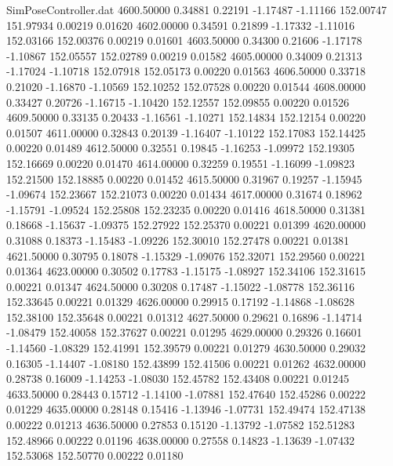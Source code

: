 \begin{filecontents}{SimPoseController.dat}
4600.50000    0.34881    0.22191    -1.17487   -1.11166  152.00747  151.97934    0.00219    0.01620
4602.00000    0.34591    0.21899    -1.17332   -1.11016  152.03166  152.00376    0.00219    0.01601
4603.50000    0.34300    0.21606    -1.17178   -1.10867  152.05557  152.02789    0.00219    0.01582
4605.00000    0.34009    0.21313    -1.17024   -1.10718  152.07918  152.05173    0.00220    0.01563
4606.50000    0.33718    0.21020    -1.16870   -1.10569  152.10252  152.07528    0.00220    0.01544
4608.00000    0.33427    0.20726    -1.16715   -1.10420  152.12557  152.09855    0.00220    0.01526
4609.50000    0.33135    0.20433    -1.16561   -1.10271  152.14834  152.12154    0.00220    0.01507
4611.00000    0.32843    0.20139    -1.16407   -1.10122  152.17083  152.14425    0.00220    0.01489
4612.50000    0.32551    0.19845    -1.16253   -1.09972  152.19305  152.16669    0.00220    0.01470
4614.00000    0.32259    0.19551    -1.16099   -1.09823  152.21500  152.18885    0.00220    0.01452
4615.50000    0.31967    0.19257    -1.15945   -1.09674  152.23667  152.21073    0.00220    0.01434
4617.00000    0.31674    0.18962    -1.15791   -1.09524  152.25808  152.23235    0.00220    0.01416
4618.50000    0.31381    0.18668    -1.15637   -1.09375  152.27922  152.25370    0.00221    0.01399
4620.00000    0.31088    0.18373    -1.15483   -1.09226  152.30010  152.27478    0.00221    0.01381
4621.50000    0.30795    0.18078    -1.15329   -1.09076  152.32071  152.29560    0.00221    0.01364
4623.00000    0.30502    0.17783    -1.15175   -1.08927  152.34106  152.31615    0.00221    0.01347
4624.50000    0.30208    0.17487    -1.15022   -1.08778  152.36116  152.33645    0.00221    0.01329
4626.00000    0.29915    0.17192    -1.14868   -1.08628  152.38100  152.35648    0.00221    0.01312
4627.50000    0.29621    0.16896    -1.14714   -1.08479  152.40058  152.37627    0.00221    0.01295
4629.00000    0.29326    0.16601    -1.14560   -1.08329  152.41991  152.39579    0.00221    0.01279
4630.50000    0.29032    0.16305    -1.14407   -1.08180  152.43899  152.41506    0.00221    0.01262
4632.00000    0.28738    0.16009    -1.14253   -1.08030  152.45782  152.43408    0.00221    0.01245
4633.50000    0.28443    0.15712    -1.14100   -1.07881  152.47640  152.45286    0.00222    0.01229
4635.00000    0.28148    0.15416    -1.13946   -1.07731  152.49474  152.47138    0.00222    0.01213
4636.50000    0.27853    0.15120    -1.13792   -1.07582  152.51283  152.48966    0.00222    0.01196
4638.00000    0.27558    0.14823    -1.13639   -1.07432  152.53068  152.50770    0.00222    0.01180

\end{filecontents}
